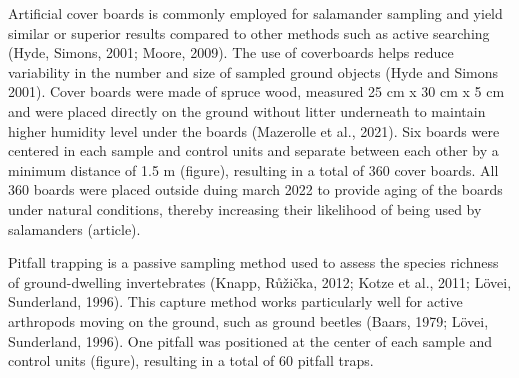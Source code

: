 Artificial cover boards is commonly employed for salamander sampling and yield similar or superior results compared to other methods such as active searching (Hyde, Simons, 2001; Moore, 2009). 
The use of coverboards helps reduce variability in the number and size of sampled ground objects (Hyde and Simons 2001). 
Cover boards were made of spruce wood, measured 25 cm x 30 cm x 5 cm and were placed directly on the ground without litter underneath 
to maintain higher humidity level under the boards (Mazerolle et al., 2021). 
Six boards were centered in each sample and control units and separate between each other by a minimum distance of 1.5 m (figure), resulting in a total of 360 cover boards. 
All 360 boards were placed outside duing march 2022 to provide aging of the boards under natural conditions, thereby increasing their likelihood of being used by salamanders (article).  

Pitfall trapping is a passive sampling method used to assess the species richness of ground-dwelling invertebrates (Knapp, Růžička, 2012; Kotze et al., 2011; Lövei,  Sunderland, 1996). 
This capture method works particularly well for active arthropods moving on the ground, such as ground beetles (Baars, 1979; Lövei, Sunderland, 1996). 
One pitfall was positioned at the center of each sample and control units (figure), resulting in a total of 60 pitfall traps.

